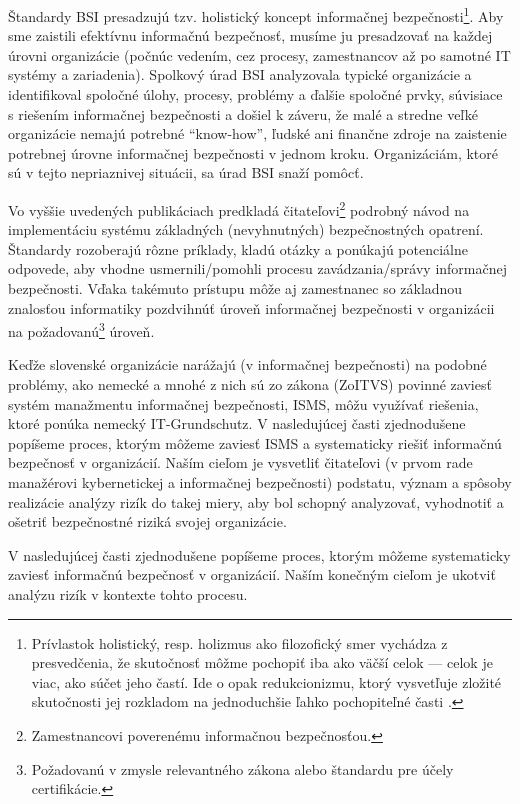 Štandardy BSI presadzujú tzv. holistický koncept informačnej bezpečnosti\footnote{Prívlastok holistický, resp.
holizmus ako filozofický smer vychádza z presvedčenia, že skutočnosť môžme pochopiť iba ako väčší celok --- celok
je viac, ako súčet jeho častí. Ide o opak redukcionizmu, ktorý vysvetľuje zložité skutočnosti jej rozkladom na 
jednoduchšie ľahko pochopiteľné časti \cite{WikiHolism}.}. Aby sme zaistili efektívnu informačnú bezpečnosť, musíme ju
presadzovať na každej úrovni organizácie (počnúc vedením, cez procesy, zamestnancov až po samotné IT systémy a zariadenia).
Spolkový úrad BSI analyzovala typické organizácie a identifikoval spoločné úlohy, procesy, problémy a ďalšie
spoločné prvky, súvisiace s riešením informačnej bezpečnosti a došiel k záveru, že malé a stredne veľké organizácie
nemajú potrebné \enquote{know-how}, ľudské ani finančne zdroje na zaistenie potrebnej úrovne informačnej bezpečnosti v
jednom kroku\cite{BSI1}. Organizáciám, ktoré sú v tejto nepriaznivej situácii, sa úrad BSI snaží pomôcť. 

Vo vyššie uvedených publikáciach predkladá čitateľovi\footnote{Zamestnancovi poverenému informačnou bezpečnosťou.} 
podrobný návod na implementáciu systému základných (nevyhnutných) bezpečnostných opatrení. Štandardy rozoberajú rôzne
príklady, kladú otázky a ponúkajú potenciálne odpovede, aby vhodne usmernili/pomohli procesu zavádzania/správy
informačnej bezpečnosti. Vďaka takémuto prístupu môže aj zamestnanec so základnou znalosťou informatiky pozdvihnúť
úroveň informačnej bezpečnosti v organizácii na požadovanú\footnote{Požadovanú v zmysle relevantného zákona alebo
štandardu pre účely certifikácie.} úroveň. 

Keďže slovenské organizácie narážajú (v informačnej bezpečnosti) na podobné problémy, ako nemecké a mnohé z nich sú zo
zákona (ZoITVS) povinné zaviesť systém manažmentu informačnej bezpečnosti, ISMS, môžu využívať riešenia, ktoré ponúka
nemecký IT-Grundschutz. V nasledujúcej časti zjednodušene popíšeme proces, ktorým môžeme zaviesť ISMS a systematicky 
riešiť informačnú bezpečnosť v organizácií. Naším cieľom je vysvetliť čitateľovi (v prvom rade manažérovi kybernetickej
a informačnej bezpečnosti) podstatu, význam a spôsoby realizácie analýzy rizík do takej miery, aby bol schopný analyzovať,
vyhodnotiť a ošetriť bezpečnostné riziká svojej organizácie.

V nasledujúcej časti zjednodušene popíšeme proces, ktorým môžeme systematicky zaviesť informačnú bezpečnosť v organizácií.
Naším konečným cieľom je ukotviť analýzu rizík v kontexte tohto procesu.

